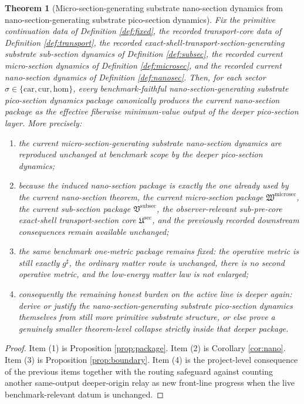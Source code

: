 \documentclass[11pt]{article}
\newcommand{\CompletedMetric}{g^{\sharp}}
\newcommand{\Car}{\mathrm{car}}
\newcommand{\Cur}{\mathrm{cur}}
\newcommand{\Hom}{\mathrm{hom}}
\newcommand{\SubPreSectionCore}{\mathfrak U^{\mathrm{sec}}}
\newcommand{\SubSectionPackage}{\mathfrak V^{\mathrm{subsec}}}
\newcommand{\MicroSectionPackage}{\mathfrak W^{\mathrm{microsec}}}
\newtheorem{theorem}{Theorem}
\begin{document}
\begin{theorem}[Micro-section-generating substrate nano-section dynamics from nano-section-generating substrate pico-section dynamics]
\label{thm:main}
Fix the primitive continuation data of Definition \ref{def:fixed}, the recorded transport-core data of Definition \ref{def:transport}, the recorded exact-shell-transport-section-generating substrate sub-section dynamics of Definition \ref{def:subsec}, the recorded current micro-section dynamics of Definition \ref{def:microsec}, and the recorded current nano-section dynamics of Definition \ref{def:nanosec}. Then, for each sector \(\sigma\in\{\Car,\Cur,\Hom\}\), every benchmark-faithful nano-section-generating substrate pico-section dynamics package canonically produces the current nano-section package as the effective fiberwise minimum-value output of the deeper pico-section layer. More precisely:
\begin{enumerate}
    \item the current micro-section-generating substrate nano-section dynamics are reproduced unchanged at benchmark scope by the deeper pico-section dynamics;
    \item because the induced nano-section package is exactly the one already used by the current nano-section theorem, the current micro-section package \(\MicroSectionPackage\), the current sub-section package \(\SubSectionPackage\), the observer-relevant sub-pre-core exact-shell transport-section core \(\SubPreSectionCore\), and the previously recorded downstream consequences remain available unchanged;
    \item the same benchmark one-metric package remains fixed: the operative metric is still exactly \(\CompletedMetric\), the ordinary matter route is unchanged, there is no second operative metric, and the low-energy matter law is not enlarged;
    \item consequently the remaining honest burden on the active line is deeper again: derive or justify the nano-section-generating substrate pico-section dynamics themselves from still more primitive substrate structure, or else prove a genuinely smaller theorem-level collapse strictly inside that deeper package.
\end{enumerate}
\end{theorem}

\begin{proof}
Item (1) is Proposition \ref{prop:package}. Item (2) is Corollary \ref{cor:nano}. Item (3) is Proposition \ref{prop:boundary}. Item (4) is the project-level consequence of the previous items together with the routing safeguard against counting another same-output deeper-origin relay as new front-line progress when the live benchmark-relevant datum is unchanged.
\end{proof}
\end{document}
